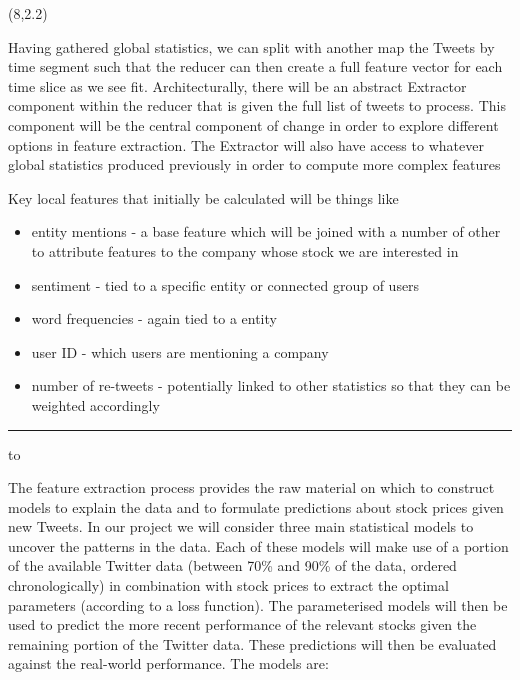 \documentclass[a0]{a0poster}
\def\Head#1{\noindent\hbox to \hsize{\hfil{\LARGE\color{DarkBlue}\sf #1}}\bigskip}
\def\Subhead#1{\noindent{\large\color{DarkBlue}\sf #1}\bigskip}
\begin{document}
\begin{textblock}{7}(8,2.2)

\Subhead{Extractor}

\sf
Having gathered global statistics, we can split with another map the Tweets by time segment such that the reducer can then create a full feature vector for each time slice as we see fit.
Architecturally, there will be an abstract Extractor component within the reducer that is given the full list of tweets to process.
This component will be the central component of change in order to explore different options in feature extraction.
The Extractor will also have access to whatever global statistics produced previously in order to compute more complex features

\sf
Key local features that initially be calculated will be things like
\begin{itemize}
\item entity mentions - a base feature which will be joined with a number of other to attribute features to the company whose stock we are interested in
\item sentiment - tied to a specific entity or connected group of users
\item word frequencies - again tied to a entity
\item user ID - which users are mentioning a company
\item number of re-tweets - potentially linked to other statistics so that they can be weighted accordingly
\end{itemize}

\bigskip
\hrule





\Head{Machine Learning}

\sf
The feature extraction process provides the raw material on which to construct models to explain the data and to formulate predictions about stock prices given new Tweets. In our project we will consider three main statistical models to uncover the patterns in the data.
Each of these models will make use of a portion of the available Twitter data (between 70\% and 90\% of the data, ordered chronologically) in combination with stock prices to extract the optimal parameters (according to a loss function). The parameterised models will then be used to predict the more recent performance of the relevant stocks given the remaining portion of the Twitter data. These predictions will then be evaluated against the real-world performance. 
The models are:


\end{textblock}
\end{document}
